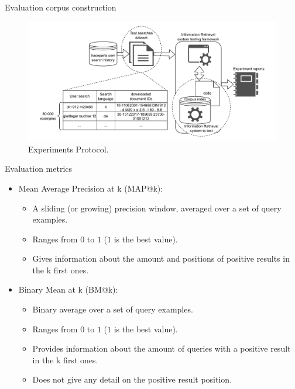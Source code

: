 \begin{frame}{Evaluation corpus construction}

    \begin{figure} [H]
        \begin{center}
            \includegraphics[scale=0.55]{images/tp-search-expe-setting.pdf} 
            \caption{Experiments Protocol.} 
        \end{center}
    \end{figure}

\end{frame}

\begin{frame}{Evaluation metrics}

    \begin{itemize}
        \item Mean Average Precision at k (MAP@k): 
        \begin{itemize}
            \item A sliding (or growing) precision window, averaged over a set of query examples.
            \item Ranges from $0$ to $1$ ($1$ is the best value).
            \item Gives information about the amount and positions of positive results in the k first ones.
        \end{itemize}
        \item Binary Mean at k (BM@k):
        \begin{itemize}
            \item Binary average over a set of query examples.
            \item Ranges from $0$ to $1$ ($1$ is the best value).
            \item Provides information about the amount of queries with a positive result in the k first ones.
            \item Does not give any detail on the positive result position.
        \end{itemize}
    \end{itemize}

\end{frame}

